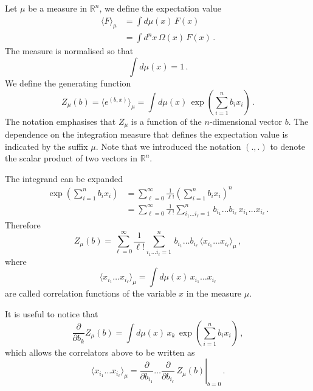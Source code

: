 \documentclass[notes.tex]{subfiles}
\begin{document}
Let $\mu$ be a measure in $\mathbb{R}^n$, we define the expectation value 
\begin{align}
  \label{eq:ExpValMu}
  \langle F \rangle_\mu &= \int d\mu(x)\, F(x) \\
  &= \int d^nx\, \Omega(x)\, F(x)\, .
\end{align}
The measure is normalised so that
\begin{equation}
  \label{eq:MeasureNorm}
  \int d\mu(x) = 1\, .
\end{equation}
We define the generating function
\begin{equation}
  \label{eq:ZGenFunc}
  Z_\mu(b) = \langle e^{(b,x)}\rangle_\mu = 
  \int d\mu(x)\, \exp\left(
    \sum_{i=1}^n b_i x_i
  \right)\, .
\end{equation}
The notation emphasises that $Z_\mu$ is a function of the $n$-dimensional vector $b$. The dependence on the integration measure that defines the expectation value is indicated by the suffix $\mu$. Note that we introduced the notation $(.,.)$ to denote the scalar product of two vectors in $\mathbb{R}^n$.

The integrand can be expanded
\begin{align}
  \exp\left(
    \sum_{i=1}^n b_i x_i
  \right) &= 
            \sum_{\ell=0}^\infty \frac{1}{\ell!} \left(
    \sum_{i=1}^n b_i x_i
  \right)^n \\
  &= \sum_{\ell=0}^\infty \frac{1}{\ell!}
    \sum_{i_1 \ldots i_\ell=1}^n \, b_{i_1} \ldots b_{i_\ell}\,
    x_{i_1} \ldots x_{i_\ell}\, .
\end{align}
Therefore
\begin{equation}
  \label{eq:ZExp}
  Z_\mu(b) =  \sum_{\ell=0}^\infty \frac{1}{\ell!}
    \sum_{i_1 \ldots i_\ell=1}^n \, b_{i_1} \ldots b_{i_\ell}\,
    \langle x_{i_1} \ldots x_{i_\ell}\rangle_\mu\, ,
\end{equation}
where
\begin{equation}
  \label{eq:XCorrel}
   \langle x_{i_1} \ldots x_{i_\ell}\rangle_\mu = 
   \int d\mu(x)\, x_{i_1} \ldots x_{i_\ell}
\end{equation}
are called correlation functions of the variable $x$ in the measure $\mu$.

It is useful to notice that 
\begin{equation}
  \label{eq:DiffGenFunct}
  \frac{\partial}{\partial b_k} Z_\mu(b) = \int d\mu(x)\, x_k\, \exp\left(
    \sum_{i=1}^n b_i x_i
  \right)\, ,
\end{equation}
which allows the correlators above to be written as
\begin{equation}
  \label{eq:DiffGenFunctCorr}
  \langle x_{i_1} \ldots x_{i_\ell}\rangle_\mu = \left.
  \frac{\partial}{\partial b_{i_1}} \ldots \frac{\partial}{\partial b_{i_\ell}}\,
  Z_\mu(b) \right|_{b=0}\, .
\end{equation}
\end{document}
